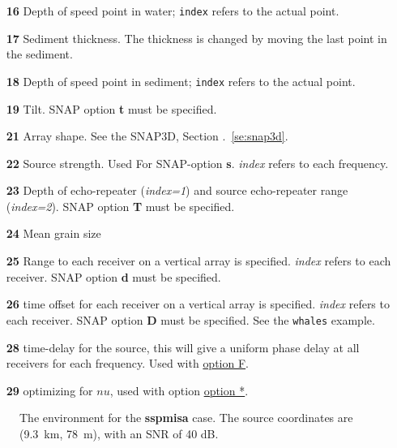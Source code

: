 \documentclass{saclantc}
\begin{document}
\begin{itemize}
    \item[\bf 16]  Depth of speed point  in water;
               {\tt index} refers to the actual point.
\vspace{-0.3cm}
    \item[\bf 17] Sediment thickness. The thickness is changed by moving the last 
point in the sediment. 
\vspace{-0.3cm}
    \item[\bf 18]  Depth of speed point  in sediment;
               {\tt index} refers to the actual point.
\vspace{-0.3cm}
    \item[\bf 19] Tilt. {\sf SNAP} option {\bf t} must be specified.
\vspace{-0.3cm}
    \item[\bf 21] Array shape. See the {\sc SNAP3D}, Section .~\ref{se:snap3d}.
\vspace{-0.3cm}
    \item[\bf 22] Source strength. Used For SNAP-option {\bf s}. {\it index} refers to each frequency. 
\vspace{-0.3cm}
    \item[\bf 23] Depth of echo-repeater ({\it index=1}) and source echo-repeater range ({\it index=2}). {\sf SNAP} option {\bf T} must be specified.
 \item[\bf 24] Mean grain size
 \item[\bf 25] Range to each receiver on a vertical array is
 specified. {\it index} refers to each receiver.  {\sf SNAP} option {\bf d} must be specified.
 \item[\bf 26] time offset for each receiver on a vertical array is
 specified. {\it index} refers to each receiver.  {\sf SNAP} option {\bf D} must be specified. See the {\tt whales} example.
 \item[\bf 28] time-delay for the source, this will give a uniform phase delay at all receivers for each frequency. Used with \underline{option F}.
  \item[\bf 29] optimizing for $nu$, used with option \underline{option *}.
\end{itemize}

\begin{figure}
\epsfxsize=12cm
\centerline{}
\caption{The environment for the {\bf sspmisa} case.
The source coordinates are (9.3~km, 78~m), with an SNR of 40 dB.} 
\label{fig:sspmis}
\end{figure}
\end{document}
